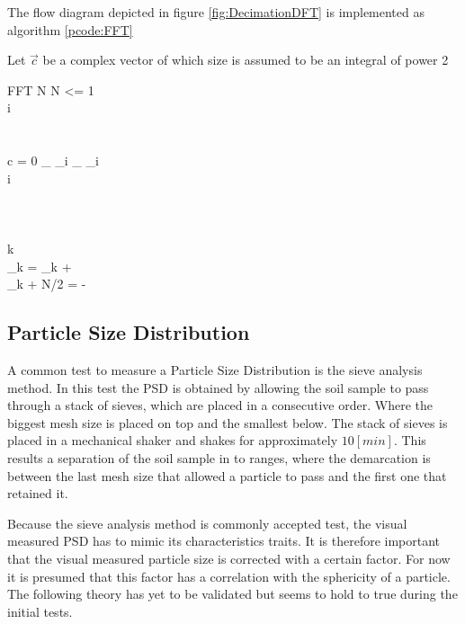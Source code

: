 \documentclass[11pt,fleqn,,a4paper,twoside,openright]{book}
\begin{document}
The flow diagram depicted in figure \ref{fig:DecimationDFT} is implemented as algorithm \ref{pcode:FFT} \\
\begin{sBox}
	Let $ \vec{c} $ be a complex vector of which size is assumed to be an integral of power 2 \\
	\begin{pseudocode}{FFT}{}\label{pcode:FFT}
	N 
	\IF N <= 1 \THEN {} \\
	i  \\
	  \\
	  \\
	\FOREACH c \in {} \DO
	\BEGIN
		\IF {} = 0 \THEN {}_{} \GETS {}_i
		\ELSE {}_{} \GETS {}_i \\
		i \\
	\END \\
	
	 \\
	 \\
	
	\FOR k  \TO {} \DO
	\BEGIN
		  \\
		_k = _{k} +  \\
		_{k + N/2} =  -  \\
	\END
	
	\end{pseudocode}
\end{sBox}

\subsection{Particle Size Distribution}
A common test to measure a Particle Size Distribution is the sieve analysis method. In this test the PSD is obtained by allowing the soil sample to pass through a stack of sieves, which are placed in a consecutive order. Where the biggest mesh size is placed on top and the smallest below. The stack of sieves is placed in a mechanical shaker and shakes for approximately $ 10 [min] $. This results a separation of the soil sample in to ranges, where the demarcation is between the last mesh size that allowed a particle to pass and the first one that retained it.

Because the sieve analysis method is commonly accepted test, the visual measured PSD has to mimic its characteristics traits. It is therefore important that the visual measured particle size is corrected with a certain factor. For now it is presumed that this factor has a correlation with the sphericity of a particle. The following theory has yet to be validated but seems to hold to true during the initial tests.
\end{document}
